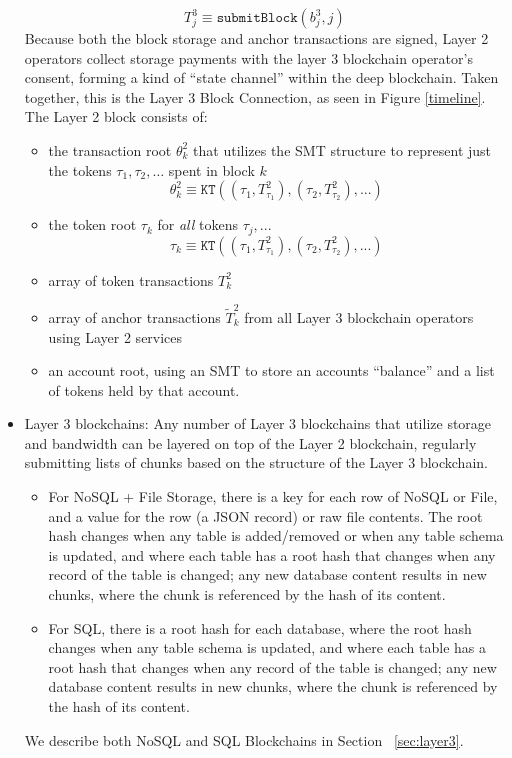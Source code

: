 \documentclass{article}
\newcommand{\blockhash}[2]{b^{#1}_{#2}}
\newcommand{\transaction}[2]{T_{#2}^#1}
\newcommand{\anchortransaction}[2]{\tilde{T}_{#2}^#1}
\newcommand{\transactionroot}[2]{\theta_{#2}^#1}
\newcommand{\tokenroot}[1]{\tau_{#1}}
\newcommand{\submitblock}[2]{\texttt{submitBlock}(#2, #1)}
\begin{document}
\begin{itemize}
\begin{equation}
\transaction{3}{j} \equiv \submitblock{j}{\blockhash{3}{j}}
\end{equation}
Because both the block storage and anchor transactions are signed, Layer 2 operators collect storage payments with the layer 3 blockchain operator's consent, forming a kind of ``state channel'' within the deep blockchain.  Taken together, this is the Layer 3 Block Connection, as seen in Figure \ref{timeline}.  The Layer 2 block consists of:
\begin{itemize}
\item the transaction root $\transactionroot{2}{k}$ that utilizes the SMT structure to represent just the tokens $\tau_1, \tau_2, \ldots$ spent in block $k$
\begin{equation}
\transactionroot{2}{k} \equiv \texttt{KT}( (\tau_1, \transaction{2}{\tau_1}), (\tau_2, \transaction{2}{\tau_2}), ... )
\end{equation}
\item the token root $\tokenroot{k}$  for {\em all} tokens $\tau_j, ...$
\begin{equation}
\tokenroot{k} \equiv \texttt{KT}( (\tau_1, \transaction{2}{\tau_1}), (\tau_2, \transaction{2}{\tau_2}), ... ) 
\end{equation}
\item array of token transactions  $\transaction{2}{k}$
\item array of anchor transactions  $\anchortransaction{2}{k}$ from all Layer 3 blockchain operators using Layer 2 services 
\item an account root, using an SMT to store an accounts ``balance'' and a list of tokens held by that account.
\end{itemize}

\item Layer 3 blockchains:  Any number of Layer 3 blockchains that utilize storage and bandwidth can be layered on top of the Layer 2 blockchain, regularly submitting lists of chunks based on the structure of the Layer 3 blockchain.  
\begin{itemize}
    \item For NoSQL + File Storage, there is a key for each row of NoSQL or File, and a value for the row (a JSON record) or raw file contents.   The root hash changes when any table is added/removed or when any table schema is updated, and where each table has a root hash that changes when any record of the table is changed; any new database content results in new chunks, where the chunk is referenced by the hash of its content.
    \item For SQL, there is a root hash for each database, where the root hash changes when any table schema is updated, and where each table has a root hash that changes when any record of the table is changed; any new database content results in new chunks, where the chunk is referenced by the hash of its content.
\end{itemize}  
We describe both NoSQL and SQL Blockchains in Section ~\ref{sec:layer3}.
\end{itemize}
\end{document}
